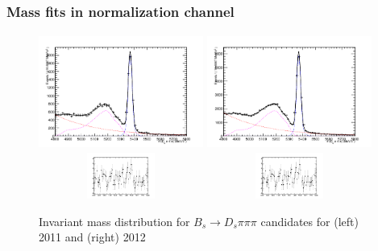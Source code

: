 \documentclass[]{beamer}
\begin{document}
\begin{frame}
\frametitle{Mass fits in normalization channel}

\begin{figure}
\includegraphics[width=5.4cm,height=3.8cm]{pics/3pi_BmassFit_11}
\includegraphics[width=5.4cm,height=3.8cm]{pics/3pi_BmassFit_12}\\
\includegraphics[width=5.4cm,height=1.5cm]{pics/3pi_pull_11}
\includegraphics[width=5.4cm,height=1.5cm]{pics/3pi_pull_11}
\caption{Invariant mass distribution for $B_{s}\rightarrow D_{s}\pi\pi\pi$ candidates for (left) 2011 and (right) 2012}
\end{figure}



\end{frame}
\end{document}
